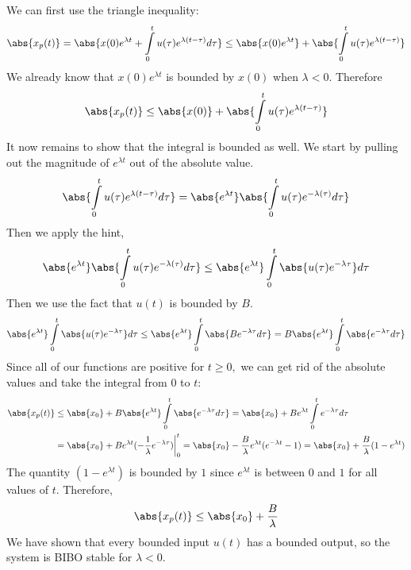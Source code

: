 \begin{enumerate}
{    We can first use the triangle inequality:
    $$\abs{x_{p}(t)} = \abs{x(0) e^{\lambda t} + \int\limits_{0}^{t} u(\tau) e^{\lambda(t - \tau)} d \tau} \leq 
    \abs{x(0) e^{\lambda t}} + \abs{\int\limits_{0}^{t} u(\tau) e^{\lambda(t - \tau)}}$$
    We already know that $x(0) e^{\lambda t}$ is bounded by $x(0)$ when $\lambda < 0.$ Therefore
    $$\abs{x_{p}(t)} \leq \abs{x(0)} + \abs{\int\limits_{0}^{t} u(\tau) e^{\lambda(t - \tau)}}$$
    It now remains to show that the integral is bounded as well. 
    We start by pulling out the magnitude of $e^{\lambda t}$ out of the absolute value.
    $$\abs{\int\limits_{0}^{t} u(\tau) e^{\lambda(t - \tau)} d \tau} = 
    \abs{e^{\lambda t}} \abs{\int\limits_{0}^{t} u(\tau) e^{-\lambda(\tau)} d \tau}$$
    Then we apply the hint, 
    $$\abs{e^{\lambda t}} \abs{\int\limits_{0}^{t} u(\tau) e^{-\lambda(\tau)} d \tau}
    \leq \abs{e^{\lambda t}} \int\limits_{0}^{t} \abs{u(\tau) e^{-\lambda \tau}} d \tau$$
    Then we use the fact that $u(t)$ is bounded by $B.$
    $$\abs{e^{\lambda t}} \int\limits_{0}^{t} \abs{u(\tau) e^{-\lambda \tau}} d \tau
    \leq \abs{e^{\lambda t}}  \int\limits_{0}^{t} \abs{B e^{-\lambda \tau} d \tau} = 
    B \abs{e^{\lambda t}} \int\limits_{0}^{t} \abs{e^{-\lambda \tau} d \tau}$$
    Since all of our functions are positive for $t \geq 0,$ we can get rid of the absolute values and take the integral from $0$ to $t$:
    \begin{align*}
    \abs{x_{p}(t)} &\leq \abs{x_{0}} + B \abs{e^{\lambda t}} \int\limits_{0}^{t} \abs{e^{-\lambda \tau} d \tau} = \abs{x_{0}} + B e^{\lambda t} \int\limits_{0}^{t} e^{-\lambda \tau} d \tau \\
    &= \abs{x_{0}} + Be^{\lambda t} (-\frac{1}{\lambda} e^{-\lambda \tau})\biggr\rvert_{0}^{t} 
    = \abs{x_{0}} - \frac{B}{\lambda}e^{\lambda t} (e^{-\lambda t} - 1) = \abs{x_{0}} + 
    \frac{B}{\lambda} (1 - e^{\lambda t}) 
    \end{align*}
    The quantity $(1 - e^{\lambda t})$ is bounded by $1$ since $e^{\lambda t}$ is between $0$ and $1$ for all values of $t.$ Therefore,
    $$\abs{x_{p}(t)} \leq \abs{x_{0}} + \frac{B}{\lambda}$$
    We have shown that every bounded input $u(t)$ has a bounded output, so the system is BIBO stable for $\lambda < 0.$
  }

\end{enumerate}